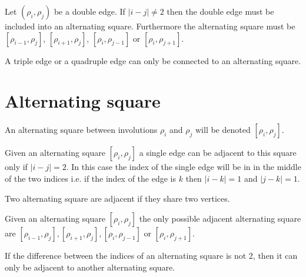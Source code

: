 \begin{corollary}
  \label{continue-double-edge}
  Let $(\rho_i, \rho_j)$ be a double edge. If $|i - j| \neq 2$ then the double edge must be included into an alternating square. Furthermore the alternating square must be  $[\rho_{i-1}, \rho_j]$, $[\rho_{i+1}, \rho_j]$, $[\rho_i, \rho_{j-1}]$ or $[\rho_i, \rho_{j+1}]$.
\end{corollary}

\begin{proposition}
  \label{continue-triple-edge}
  A triple edge or a quadruple edge can only be connected to an alternating square.
\end{proposition}

\section{Alternating square}

\begin{notation}
  An alternating square between involutions $\rho_i$ and $\rho_j$ will be denoted $[\rho_i, \rho_j]$.
\end{notation}

\begin{proposition}
  \label{square-connection}
  Given an alternating square $[\rho_i, \rho_j]$ a single edge can be adjacent to this square only if $|i - j| = 2$. In this case the index of the single edge will be in in the middle of the two indices i.e. if the index of the edge is $k$ then $|i-k| = 1$ and $|j-k| = 1$.
\end{proposition}

\begin{definition}
  Two alternating square are adjacent if they share two vertices.
\end{definition}

\begin{proposition}
  \label{adjacent-squares}
  Given an alternating square $[\rho_i, \rho_j]$ the only possible adjacent alternating square are $[\rho_{i-1}, \rho_j], [\rho_{i+1}, \rho_j], [\rho_i, \rho_{j-1}]$ or $[\rho_i, \rho_{j+1}]$.
\end{proposition}

\begin{corollary}
  \label{continue-alternating-square}
  If the difference between the indices of an alternating square is not 2, then it can only be adjacent to another alternating square.
\end{corollary}

